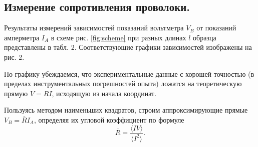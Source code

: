 \documentclass[12pt,a4paper]{article}
\begin{document}
\subsection{ Измерение сопротивления проволоки.}

Результаты измерений зависимостей показаний вольтметра $V_B$ от показаний амперметра $I_A$ в схеме рис. \ref{fig:scheme} при разных длинах $l$ образца представлены в табл. 2. Соответствующие графики зависимостей изображены на рис. 2.

По графику убеждаемся, что экспериментальные данные с хорошей точностью (в пределах
инструментальных погрешностей опыта) ложатся на теоретическую прямую $V=RI$, исходящую из начала координат.

Пользуясь методом наименьших квадратов, строим аппроксимирующие прямые $V_B=\overline{R}I_A$,
определяя их угловой коэффициент по формуле
\begin{equation}
    \overline{R}=\frac{\langle IV \rangle}{\langle I^2 \rangle}.
\end{equation}
\end{document}

